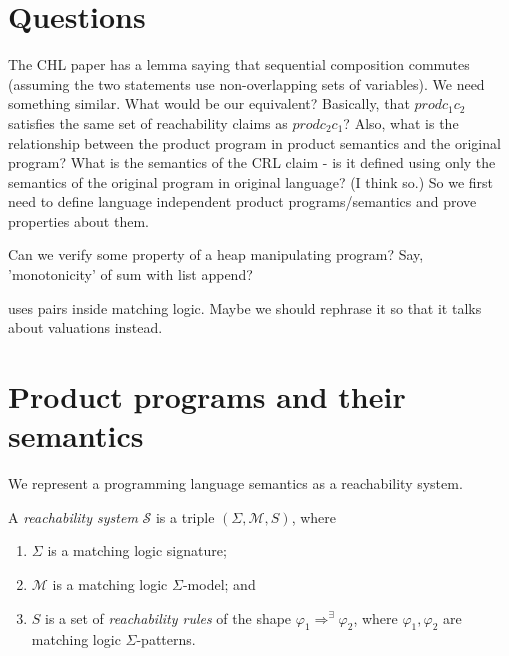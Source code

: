 \documentclass{article}
\begin{document}
\section{Questions}

The CHL paper has a lemma saying that sequential composition commutes (assuming the two statements use non-overlapping sets of variables).
We need something similar. What would be our equivalent? Basically, that
$\mathit{prod} c_1 c_2$ satisfies the same set of reachability claims as $\mathit{prod} c_2 c_1$?
Also, what is the relationship between the product program in product semantics and the original program? What is the semantics of the CRL claim - is it defined using only the semantics of the original program in original language? (I think so.) So we first need to define language independent product programs/semantics and prove properties about them.

Can we verify some property of a heap manipulating program? Say, 'monotonicity' of sum with list append?


 uses pairs inside matching logic. Maybe we should rephrase it so that it talks about valuations instead.

\section{Product programs and their semantics}
We represent a programming language semantics as a reachability system.
\begin{definition}\label{def:RLsystem}
A \emph{reachability system} $\mathcal{S}$ is a triple $(\Sigma, \mathcal{M}, S)$, where
\begin{enumerate}
    \item $\Sigma$ is a matching logic signature;
    \item $\mathcal{M}$ is a matching logic $\Sigma$-model; and
    \item $S$ is a set of \emph{reachability rules} of the shape
    $\varphi_1 \Rightarrow^\exists \varphi_2$, where $\varphi_1,\varphi_2$ are matching logic $\Sigma$-patterns.
\end{enumerate}
\end{definition}
\end{document}
